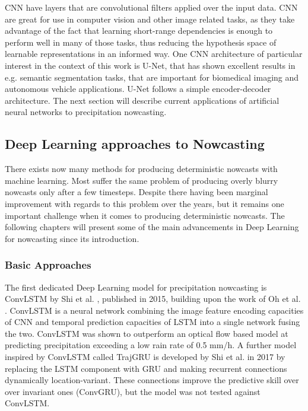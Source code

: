 CNN have layers that are convolutional filters applied over the input data. CNN are great for use in computer vision and other image related tasks, as they take advantage of the fact that learning short-range dependencies is enough to perform well in many of those tasks, thus reducing the hypothesis space of learnable representations in an informed way. One CNN architecture of particular interest in the context of this work is U-Net, that has shown excellent results in e.g. semantic segmentation tasks, that are important for biomedical imaging and autonomous vehicle applications. U-Net follows a simple encoder-decoder architecture. The next section will describe current applications of artificial neural networks to precipitation nowcasting.



\subsection{Deep Learning approaches to Nowcasting}


There exists now many methods for producing deterministic nowcasts with machine learning. Most suffer the same problem of producing overly blurry nowcasts only after a few timesteps. Despite there having been marginal improvement with regards to this problem over the years, but it remains one important challenge when it comes to producing deterministic nowcasts. The following chapters will present some of the main advancements in Deep Learning for nowcasting since its introduction.

\subsubsection*{Basic Approaches}
 
The first dedicated Deep Learning model for precipitation nowcasting is ConvLSTM by Shi et al. \cite{shi_convolutional_2015}, published in 2015, building upon the work of Oh et al. \cite{oh_action-conditional_2015}. ConvLSTM is a neural network combining the image feature encoding capacities of CNN and  temporal prediction capacities of LSTM into a single network fusing the two. ConvLSTM was shown to outperform an optical flow based model at predicting precipitation exceeding a low rain rate of 0.5 mm/h. 
A further model inspired by ConvLSTM called TrajGRU is developed by Shi et al. \cite{shi_deep_2017} in 2017 by replacing the LSTM component with GRU and making recurrent connections dynamically location-variant. These connections improve the predictive skill over over invariant ones (ConvGRU), but the model was not tested against ConvLSTM. 

